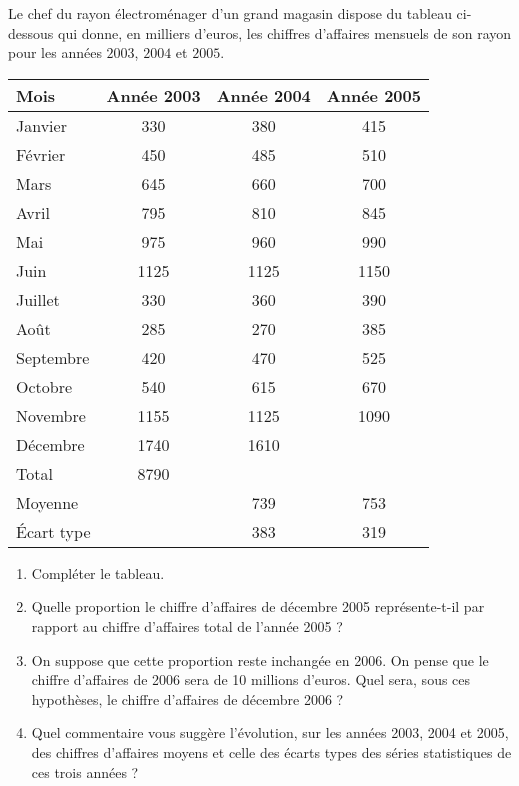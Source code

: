 
\begin{exercice}\label{exosmath-0245}

Le chef du rayon électroménager d’un grand magasin dispose du tableau ci-dessous qui donne, en milliers
d’euros, les chiffres d’affaires mensuels de son rayon pour les années $2003$, $2004$ et $2005$.


\begin{center}
\begin{tabular}[c]{|l|c|c|c|}
    \hline
Mois& Année 2003& Année 2004& Année 2005\\
\hline\hline
Janvier& 330& 380& 415\\
\hline
Février& 450& 485& 510\\
\hline
Mars& 645& 660& 700\\
\hline
Avril& 795& 810& 845\\
\hline
Mai& 975& 960& 990\\
\hline
Juin& 1125& 1125& 1150\\
\hline
Juillet& 330& 360& 390\\
\hline
Août& 285& 270& 385\\
\hline
Septembre& 420& 470& 525\\
\hline
Octobre& 540& 615& 670\\
\hline
Novembre& 1155& 1125& 1090\\
\hline
Décembre& 1740& 1610& \\
\hline\hline
Total& 8790 & & \\
 \hline\hline
Moyenne&&739&753\\
\hline
Écart type&&383&319\\
\hline
\end{tabular}
\end{center}


\begin{enumerate}
    \item
        Compléter le tableau.
            \item
 Quelle proportion le chiffre d’affaires de décembre 2005 représente-t-il par rapport au chiffre d’affaires total de l’année 2005 ?
 \item
 On suppose que cette proportion reste inchangée en 2006. On pense que le chiffre d’affaires de 2006 sera de 10 millions d’euros.  Quel sera, sous ces hypothèses, le chiffre d’affaires de décembre 2006 ?
      \item
Quel commentaire vous suggère l’évolution, sur les années 2003, 2004 et 2005, des chiffres d’affaires moyens et celle des écarts types des séries statistiques de ces trois années ?
                  
        
\end{enumerate}

\end{exercice}
